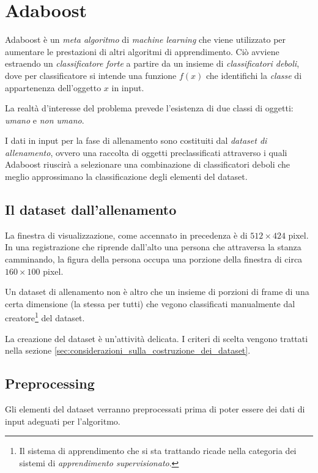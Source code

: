 
\section{Adaboost} %
\label{sec:adaboost}
    Adaboost è un \emph{meta algoritmo} di \emph{machine learning} che viene utilizzato per aumentare le prestazioni di altri algoritmi di apprendimento. Ciò avviene estraendo un \emph{classificatore forte} a partire da un insieme di \emph{classificatori deboli}, dove per classificatore si intende una funzione $f(x)$ che identifichi la \emph{classe} di appartenenza dell'oggetto $x$ in input.

    La realtà d'interesse del problema prevede l'esistenza di due classi di oggetti: \emph{umano} e \emph{non umano}.

    I dati in input per la fase di allenamento sono costituiti dal \emph{dataset di allenamento}, ovvero una raccolta di oggetti preclassificati attraverso i quali Adaboost riuscirà a selezionare una combinazione di classificatori deboli che meglio approssimano la classificazione degli elementi del dataset.

    \subsection{Il dataset dall'allenamento} %
    \label{sub:il_dataset_dall_allenamento}
        La finestra di visualizzazione, come accennato in precedenza è di $512 \times 424$ pixel. In una registrazione che riprende dall'alto una persona che attraversa la stanza camminando, la figura della persona occupa una porzione della finestra di circa $160 \times 100$ pixel.

        Un dataset di allenamento non è altro che un insieme di porzioni di frame di una certa dimensione (la stessa per tutti) che vegono classificati manualmente dal creatore\footnote{Il sistema di apprendimento che si sta trattando ricade nella categoria dei sistemi di \emph{apprendimento supervisionato}.} del dataset.

        La creazione del dataset è un'attività delicata. I criteri di scelta vengono trattati nella sezione \ref{sec:considerazioni_sulla_costruzione_dei_dataset}.


    \subsection{Preprocessing} %
    \label{sub:preprocessing}
        Gli elementi del dataset verranno preprocessati prima di poter essere dei dati di input adeguati per l'algoritmo.

